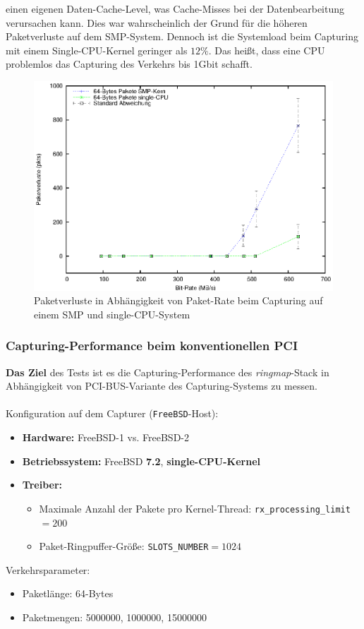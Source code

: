 einen eigenen Daten-Cache-Level, was Cache-Misses bei der Datenbearbeitung
verursachen kann. Dies war wahrscheinlich der Grund für die höheren
Paketverluste auf dem SMP-System.  Dennoch ist die Systemload beim Capturing
mit einem Single-CPU-Kernel geringer als $12\%$. Das heißt, dass eine CPU
problemlos das Capturing des Verkehrs bis 1Gbit schafft.
\begin{figure} 
\centering \includegraphics[width=5.5in]{plots/graphs/pktloss_single_vs_SMP_PCIe_mbs}
\caption{Paketverluste in Abhängigkeit von Paket-Rate beim Capturing auf einem SMP und single-CPU-System}
\label{img:plot_pktlos_single_vs_smp_mbs}
\end{figure}

\subsubsection*{Capturing-Performance beim konventionellen PCI}
\textbf{Das Ziel} des Tests ist es die Capturing-Performance des
\emph{ringmap}-Stack in Abhängigkeit von PCI-BUS-Variante des Capturing-Systems
zu messen.\\\\
%
Konfiguration auf dem Capturer (\verb+FreeBSD+-Host): 
\begin{itemize}
	\item \textbf{Hardware:} FreeBSD-1 vs. FreeBSD-2 
	\item \textbf{Betriebssystem:} FreeBSD \textbf{7.2}, \textbf{single-CPU-Kernel}
	\item \textbf{Treiber:} 
		\begin{itemize}
			\item Maximale Anzahl der Pakete pro Kernel-Thread: \verb+rx_processing_limit+$=200$
			\item Paket-Ringpuffer-Größe: \verb+SLOTS_NUMBER+$=1024$
		\end{itemize}
\end{itemize}
Verkehrsparameter:
\begin{itemize}
	\item Paketlänge: 64-Bytes
	\item Paketmengen: 5000000, 1000000, 15000000
\end{itemize}
